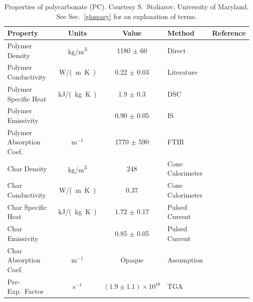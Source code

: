 \begin{table}[h!]
\caption[Properties of polycarbonate (PC)]{Properties of polycarbonate (PC). Courtesy S.~Stoliarov, University of Maryland. See Sec.~\ref{glossary} for an explanation of terms.}
\begin{center}
\begin{tabular}{|l|c|c|l|l|}
\hline
Property                    & Units         & Value                             & Method                &  Reference                                \\ \hline \hline
Polymer Density             & \unit{kg/m^3}      & 1180 $\pm$ 60                     & Direct                &  \cite{Stoliarov:CF2010}                  \\ \hline
Polymer Conductivity        & \unit{W/(m.K)}& 0.22 $\pm$ 0.03                   & Literature            &  \cite{Stoliarov:CF2010}                  \\ \hline
Polymer Specific Heat       & \unit{kJ/(kg.K)}       & 1.9 $\pm$ 0.3                     & DSC                   &  \cite{Stoliarov:PDS2008}                 \\ \hline
Polymer Emissivity          &               & 0.90 $\pm$ 0.05                   & IS                    &  \cite{Hallman:PES1974}                   \\ \hline
Polymer Absorption Coef.    & m$^{-1}$      & 1770 $\pm$ 590                    & FTIR                  &  \cite{Tsilingiris:ECM2003}               \\ \hline
Char Density                & \unit{kg/m^3}      & 248                               & Cone Calorimeter      &  \cite{Stoliarov:CF2010}                  \\ \hline
Char Conductivity           & \unit{W/(m.K)}& 0.37                              & Cone Calorimeter      &  \cite{Stoliarov:CF2010}                  \\ \hline
Char Specific Heat          & \unit{kJ/(kg.K)}       & 1.72 $\pm$ 0.17                   & Pulsed Current        &  \cite{Stoliarov:CF2010,Matsumoto:1996}   \\ \hline
Char Emissivity             &               & 0.85 $\pm$ 0.05                   & Pulsed Current        &  \cite{Stoliarov:CF2010,Matsumoto:1996}   \\ \hline
Char Absorption Coef.       & m$^{-1}$      & Opaque                            & Assumption            &  \cite{Stoliarov:CF2010}                  \\ \hline
Pre-Exp.~Factor             & s$^{-1}$      & $(1.9 \pm 1.1) \times 10^{18}$    & TGA                   &  \cite{Stoliarov:CF2010}                  \\ \hline

\end{tabular}
\end{center}
\end{table}
